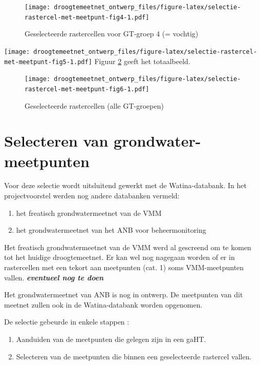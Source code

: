 \documentclass[11pt,]{book}
\providecommand{\tightlist}{%
  \setlength{\itemsep}{0pt}\setlength{\parskip}{0pt}}
\begin{document}
\begin{figure}
\centering
\texttt{[image: droogtemeetnet\_ontwerp\_files/figure-latex/selectie-rastercel-met-meetpunt-fig4-1.pdf]}
\caption{\label{fig:selectie-rastercel-met-meetpunt-fig4}Geselecteerde
rastercellen voor GT-groep 4 (= vochtig)}
\end{figure}

\texttt{[image: droogtemeetnet\_ontwerp\_files/figure-latex/selectie-rastercel-met-meetpunt-fig5-1.pdf]}
Figuur \ref{fig:selectie-rastercel-met-meetpunt-fig6} geeft het
totaalbeeld.

\begin{figure}
\centering
\texttt{[image: droogtemeetnet\_ontwerp\_files/figure-latex/selectie-rastercel-met-meetpunt-fig6-1.pdf]}
\caption{\label{fig:selectie-rastercel-met-meetpunt-fig6}Geselecteerde
rastercellen (alle GT-groepen)}
\end{figure}

\section{Selecteren van
grondwater-meetpunten}\label{selecteren-van-grondwater-meetpunten}

Voor deze selectie wordt uitsluitend gewerkt met de Watina-databank. In
het projectvoorstel werden nog andere databanken vermeld:

\begin{enumerate}
\def\labelenumi{\arabic{enumi}.}
\tightlist
\item
  het freatisch grondwatermeetnet van de VMM
\item
  het grondwatermeetnet van het ANB voor beheermonitoring
\end{enumerate}

Het freatisch grondwatermeetnet van de VMM werd al gescreend om te komen
tot het huidige droogtemeetnet. Er kan wel nog nagegaan worden of er in
rastercellen met een tekort aan meetpunten (cat. 1) soms VMM-meetpunten
vallen. \textbf{\emph{eventueel nog te doen}}

Het grondwatermeetnet van ANB is nog in ontwerp. De meetpunten van dit
meetnet zullen ook in de Watina-databank worden opgenomen.

De selectie gebeurde in enkele stappen :

\begin{enumerate}
\def\labelenumi{\arabic{enumi}.}
\tightlist
\item
  Aanduiden van de meetpunten die gelegen zijn in een gaHT.
\item
  Selecteren van de meetpunten die binnen een geselecteerde rastercel
  vallen.
\end{enumerate}
\end{document}
